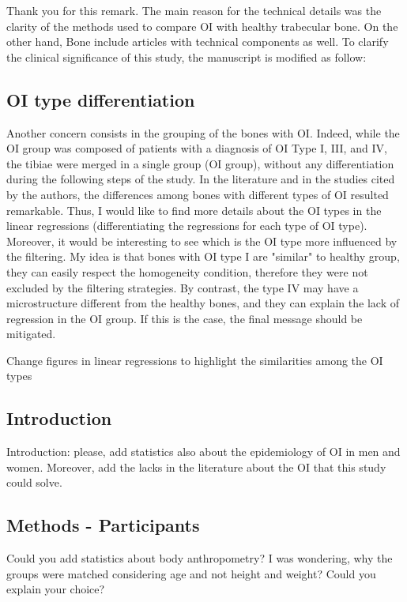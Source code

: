 \documentclass{AR2RC}
\begin{document}
\AR Thank you for this remark. The main reason for the technical details was the clarity of the methods used to compare OI with healthy trabecular bone. On the other hand, Bone include articles with technical components as well. To clarify the clinical significance of this study, the manuscript is modified as follow:

 

\subsection{OI type differentiation}

\RC Another concern consists in the grouping of the bones with OI. Indeed, while the OI group was composed of patients with a diagnosis of OI Type I, III, and IV, the tibiae were merged in a single group (OI group), without any differentiation during the following steps of the study. In the literature and in the studies cited by the authors, the differences among bones with different types of OI resulted remarkable. Thus, I would like to find more details about the OI types in the linear regressions (differentiating the regressions for each type of OI type). Moreover, it would be interesting to see which is the OI type more influenced by the filtering. My idea is that bones with OI type I are "similar" to healthy group, they can easily respect the homogeneity condition, therefore they were not excluded by the filtering strategies. By contrast, the type IV may have a microstructure different from the healthy bones, and they can explain the lack of regression in the OI group. If this is the case, the final message should be mitigated.

\AR Change figures in linear regressions to highlight the similarities among the OI types

\subsection{Introduction}
Introduction: please, add statistics also about the epidemiology of OI in men and women. Moreover, add the lacks in the literature about the OI that this study could solve.

\subsection{Methods - Participants}
Could you add statistics about body anthropometry? I was wondering, why the groups were matched considering age and not height and weight? Could you explain your choice?
\end{document}
